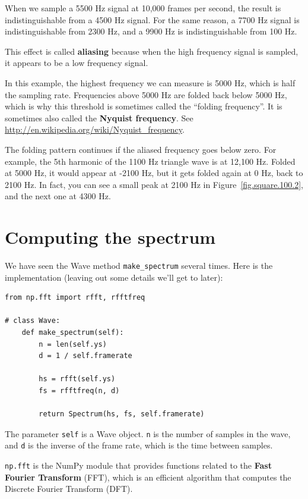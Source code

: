 \documentclass[12pt]{book}
\begin{document}
When we sample a 5500 Hz signal at 10,000 frames per second, the
result is indistinguishable from a 4500 Hz signal.
For the same reason, a 7700 Hz signal is indistinguishable
from 2300 Hz, and a 9900 Hz is indistinguishable from 100 Hz.

This effect is called {\bf aliasing} because when the high frequency
signal is sampled, it appears to be a low frequency signal.

In this example, the highest frequency we can measure is 5000 Hz,
which is half the sampling rate.  Frequencies above 5000 Hz are folded
back below 5000 Hz, which is why this threshold is sometimes called
the ``folding frequency''.  It is sometimes also called the {\bf
  Nyquist frequency}.  See
\url{http://en.wikipedia.org/wiki/Nyquist_frequency}.

The folding pattern continues if the aliased frequency goes below
zero.  For example, the 5th harmonic of the 1100 Hz triangle wave is
at 12,100 Hz.  Folded at 5000 Hz, it would appear at -2100 Hz, but it
gets folded again at 0 Hz, back to 2100 Hz.  In fact, you can see a
small peak at 2100 Hz in Figure~\ref{fig.square.100.2}, and the next
one at 4300 Hz.


\section{Computing the spectrum}

We have seen the Wave method \verb"make_spectrum" several times.
Here is the implementation (leaving out some details we'll get
to later):

\begin{verbatim}
from np.fft import rfft, rfftfreq

# class Wave:
    def make_spectrum(self):
        n = len(self.ys)
        d = 1 / self.framerate

        hs = rfft(self.ys)
        fs = rfftfreq(n, d)

        return Spectrum(hs, fs, self.framerate)
\end{verbatim}

The parameter {\tt self} is a Wave object.  {\tt n} is the number
of samples in the wave, and {\tt d} is the inverse of the
frame rate, which is the time between samples.

{\tt np.fft} is the NumPy module that provides functions related
to the {\bf Fast Fourier Transform} (FFT), which is an efficient
algorithm that computes the Discrete Fourier Transform (DFT).
\end{document}
